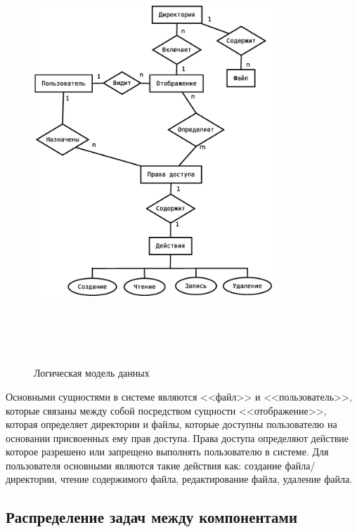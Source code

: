 \documentclass[utf8,usehyperref,12pt]{G7-32}
\begin{document}
\begin{figure}[ht]
   \centering%
   \includegraphics[height=160mm, width=0.8\textwidth, clip, keepaspectratio]{pictures/ER}
   \caption{Логическая модель данных}\label{fig:er_diagramm}
 \end{figure}
 
Основными сущностями в системе являются <<файл>> и <<пользователь>>, которые связаны между собой посредством сущности <<отображение>>, которая определяет директории и файлы, которые доступны пользователю на основании присвоенных ему прав доступа.  Права доступа определяют действие которое разрешено или запрещено выполнять пользователю в системе. Для пользователя основными являются такие действия как: создание файла/директории, чтение содержимого файла, редактирование файла, удаление файла.

\subsection{Распределение задач между компонентами}
\end{document}
